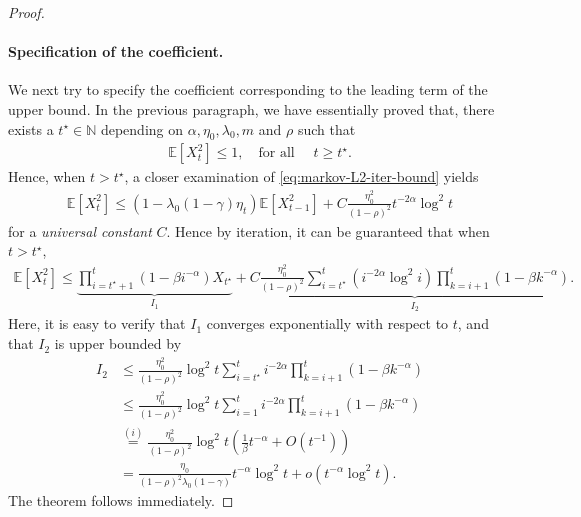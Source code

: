 \begin{proof}
\paragraph{Specification of the coefficient.} We next try to specify the coefficient corresponding to the leading term of the upper bound. In the previous paragraph, we have essentially proved that, there exists a $t^\star \in \mathbb{N}$ depending on $\alpha,\eta_0,\lambda_0,m$ and $\rho$ such that
\begin{align*}
\mathbb{E}[X_t^2] \leq 1, \quad \text{for all }\quad t \geq t^\star.
\end{align*}
Hence, when $t > t^\star$, a closer examination of \eqref{eq:markov-L2-iter-bound} yields
\begin{align*}
\mathbb{E}[X_t^2] \leq (1-\lambda_0(1-\gamma)\eta_t) \mathbb{E}[X_{t-1}^2] + C  \frac{\eta_0^2}{(1-\rho)^2} t^{-2\alpha}\log^2 t
\end{align*}
for a \emph{universal constant} $C$. Hence by iteration, it can be guaranteed that when $t > t^\star$,
\begin{align*}
\mathbb{E}[X_t^2] \leq \underset{I_1}{\underbrace{\prod_{i=t^\star+1}^t (1-\beta i^{-\alpha})X_{t^\star}}} + C  \underset{I_2}{\underbrace{\frac{\eta_0^2}{(1-\rho)^2}\sum_{i=t^\star}^t (i^{-2\alpha} \log^2 i)\prod_{k=i+1}^t (1-\beta k^{-\alpha})}}.
\end{align*}
Here, it is easy to verify that $I_1$ converges exponentially with respect to $t$, and that $I_2$ is upper bounded by
\begin{align*}
I_2 &\leq \frac{\eta_0^2}{(1-\rho)^2} \log^2 t \sum_{i=t^\star}^t i^{-2\alpha} \prod_{k=i+1}^t (1-\beta k^{-\alpha}) \\ 
&\leq \frac{\eta_0^2}{(1-\rho)^2} \log^2 t \sum_{i=1}^t i^{-2\alpha} \prod_{k=i+1}^t (1-\beta k^{-\alpha}) \\ 
&\overset{(i)}{=} \frac{\eta_0^2}{(1-\rho)^2} \log^2 t \left(\frac{1}{\beta} t^{-\alpha} + O(t^{-1})\right)\\ 
&= \frac{\eta_0}{(1-\rho)^2 \lambda_0(1-\gamma)} t^{-\alpha}\log^2 t + o(t^{-\alpha}\log^2 t).
\end{align*}
The theorem follows immediately.

\end{proof}
